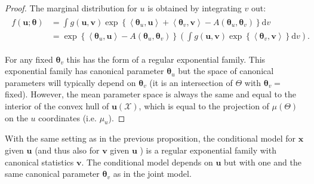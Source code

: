 \begin{proof}
    The marginal distribution for $u$ is obtained by integrating $v$ out:
\begin{align*}
\begin{aligned}
f(\boldsymbol{u} ; \boldsymbol{\theta}) & =\int g(\boldsymbol{u}, \boldsymbol{v}) \exp \left\{\left\langle\boldsymbol{\theta}_u, \boldsymbol{u}\right\rangle+\left\langle\boldsymbol{\theta}_v, \boldsymbol{v}\right\rangle-A\left(\boldsymbol{\theta}_u, \boldsymbol{\theta}_v\right)\right\} \mathrm{d} v \\
& =\exp \left\{\left\langle\boldsymbol{\theta}_u, \boldsymbol{u}\right\rangle-A\left(\boldsymbol{\theta}_u, \boldsymbol{\theta}_v\right)\right\}\left(\int g(\boldsymbol{u}, \boldsymbol{v}) \exp \left\{\left\langle\boldsymbol{\theta}_v, \boldsymbol{v}\right\rangle\right\} \mathrm{d} v\right) .
\end{aligned}
\end{align*}

For any fixed $\boldsymbol{\theta}_v$ this has the form of a regular exponential family. This exponential family has canonical parameter $\boldsymbol{\theta}_u$ but the space of canonical parameters will typically depend on $\boldsymbol{\theta}_v$ (it is an intersection of $\Theta$ with $\boldsymbol{\theta}_v=$ fixed). However, the mean parameter space is always the same and equal to the interior of the convex hull of $\boldsymbol{u}(\mathcal{X})$, which is equal to the projection of $\mu(\Theta)$ on the $u$ coordinates (i.e. $\mu_u$).
\end{proof}

\begin{prop}
     With the same setting as in the previous proposition, the conditional model for $\mathbf{x}$ given $\boldsymbol{u}$ (and thus also for $\boldsymbol{v}$ given $\boldsymbol{u}$ ) is a regular exponential family with canonical statistics $\boldsymbol{v}$. The conditional model depends on $\boldsymbol{u}$ but with one and the same canonical parameter $\boldsymbol{\theta}_v$ as in the joint model.
\end{prop}

